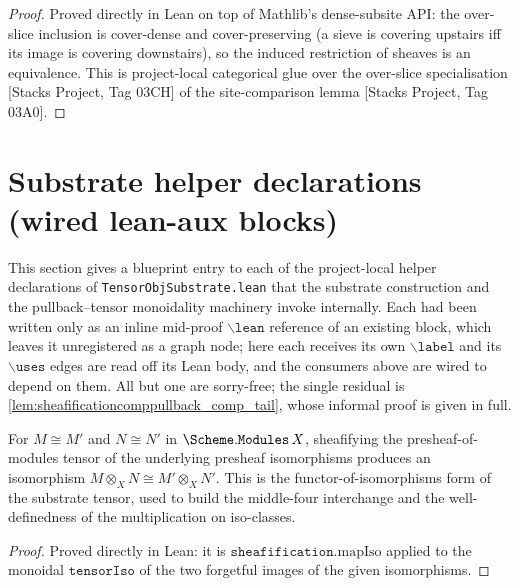 \begin{proof}
  Proved directly in Lean on top of Mathlib's dense-subsite API: the over-slice inclusion
  is cover-dense and cover-preserving (a sieve is covering upstairs iff its image is
  covering downstairs), so the induced restriction of sheaves is an equivalence. This is
  project-local categorical glue over the over-slice specialisation
  [Stacks Project, Tag 03CH] of the site-comparison lemma [Stacks Project, Tag 03A0].
\end{proof}

\section{Substrate helper declarations (wired lean-aux blocks)}
\label{sec:tensorobj_substrate_helpers}

This section gives a blueprint entry to each of the project-local helper declarations
of \texttt{TensorObjSubstrate.lean} that the substrate construction and the
pullback--tensor monoidality machinery invoke internally. Each had been written only
as an inline mid-proof \(\mathtt{\backslash lean}\) reference of an existing block,
which leaves it unregistered as a graph node; here each receives its own \(\mathtt{\backslash label}\)
and its \(\mathtt{\backslash uses}\) edges are read off its Lean body, and the consumers
above are wired to depend on them. All but one are sorry-free; the single residual is
\cref{lem:sheafificationcomppullback_comp_tail}, whose informal proof is given in full.

\begin{definition}\leanok
  \label{def:tensorobjisoofiso}
  For \(M \cong M'\) and \(N \cong N'\) in \(\Scheme.\mathtt{Modules}\,X\), sheafifying the
  presheaf-of-modules tensor of the underlying presheaf isomorphisms produces an
  isomorphism \(M \otimes_X N \cong M' \otimes_X N'\). This is the functor-of-isomorphisms
  form of the substrate tensor, used to build the middle-four interchange and the
  well-definedness of the multiplication on iso-classes.
\end{definition}
\begin{proof}
  \leanok
  Proved directly in Lean: it is \(\mathtt{sheafification}.\mathrm{mapIso}\) applied to the
  monoidal \(\mathtt{tensorIso}\) of the two forgetful images of the given isomorphisms.
\end{proof}

